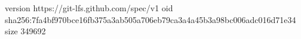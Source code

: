 version https://git-lfs.github.com/spec/v1
oid sha256:7fa4bf970bce16fb375a3ab505a706eb79ca3a4a45b3a98bc006adc016d71e34
size 349692
